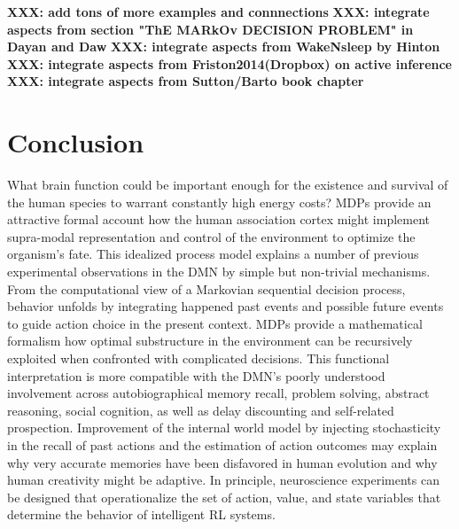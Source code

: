 \documentclass[10pt,letterpaper]{article}
\def\W{\mathbf{W}}
\begin{document}

\textbf{XXX: add tons of more examples and connnections}
\textbf{XXX: integrate aspects from section "ThE MARkOv DECISION PROBLEM" in Dayan and Daw}
\textbf{XXX: integrate aspects from WakeNsleep by Hinton}
\textbf{XXX: integrate aspects from Friston2014(Dropbox) on active inference}
\textbf{XXX: integrate aspects from Sutton/Barto book chapter}

\section{Conclusion}
What brain function could be important enough
for the existence and survival of the human species
to warrant constantly high energy costs?
MDPs provide an attractive
formal account how the human association cortex
might implement supra-modal representation and control of the environment to
optimize the organism's fate.
This idealized process model explains
a number of previous experimental observations in the
DMN by simple but non-trivial mechanisms.
%
From the computational view of a Markovian sequential decision process,
behavior unfolds by integrating happened past events
and possible future events to guide action choice in the present context.
MDPs provide a mathematical formalism how
optimal substructure in the environment can be recursively exploited
when confronted with complicated decisions.
%
This functional interpretation is more compatible with the DMN's
poorly understood involvement across
autobiographical memory recall, problem solving,
abstract reasoning, social cognition,
as well as delay discounting and self-related prospection.
Improvement of the internal world model
by injecting stochasticity in the recall of past
actions and the estimation of action outcomes may explain why
very accurate memories have been disfavored in human evolution
and why human creativity might be adaptive.
%
In principle,
neuroscience experiments can be designed that operationalize
the set of action, value, and state variables that determine
the behavior of intelligent RL systems.
\end{document}
